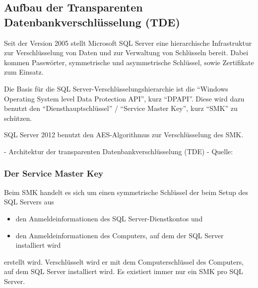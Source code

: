       \subsection{Aufbau der Transparenten Datenbankverschlüsselung (TDE)}
        Seit der Version 2005 stellt Microsoft SQL Server eine hierarchische
        Infrastruktur zur Verschlüsselung von Daten und zur Verwaltung von
        Schlüsseln bereit. Dabei kommen Passwörter, symmetrische und
        asymmetrische Schlüssel, sowie Zertifikate zum Einsatz.

        Die Basis für die SQL Server-Verschlüsselungshierarchie ist die
        \enquote{Windows Operating System level Data Protection API}, kurz
        \enquote{DPAPI}. Diese wird dazu benutzt den
        \enquote{Diensthauptschlüssel} / \enquote{Service Master Key},
        kurz \enquote{SMK} zu schützen.
        \begin{merke}
          SQL Server 2012 benutzt den AES-Algorithmus zur Verschlüsselung des
          SMK.
        \end{merke}
        \begin{scriptsize}
           - Architektur der transparenten
          Datenbankverschlüsselung (TDE) - Quelle: \parencite{bb934049}
        \end{scriptsize}
        \subsubsection{Der Service Master Key} 
          Beim SMK handelt es sich um einen symmetrische Schlüssel der beim
          Setup des SQL Servers aus
          \begin{itemize}
            \item den Anmeldeinformationen des SQL Server-Dienstkontos und 
            \item den Anmeldeinformationen des Computers, auf dem der SQL Server
            installiert wird
          \end{itemize}
          erstellt wird. Verschlüsselt wird er mit dem Computerschlüssel des
          Computers, auf dem SQL Server installiert wird. Es existiert immer nur
          ein SMK pro SQL Server.
          
